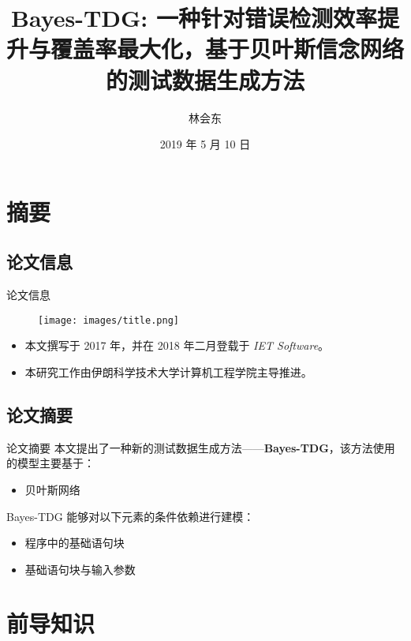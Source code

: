 \documentclass{beamer}
\title{\textbf{Bayes-TDG: 一种针对错误检测效率提升与覆盖率最大化，基于贝叶斯信念网络的测试数据生成方法}}
\author{林会东}
\institute{\textit{华南理工大学~软件学院}}
\date{2019 年 5 月 10 日}
\begin{document}
    \frame{\titlepage}

    \section{摘要}

    \subsection{论文信息}
    \begin{frame}{论文信息}
        \begin{figure}
            \centering
            \texttt{[image: images/title.png]}
        \end{figure}
        \begin{itemize}
            \item 本文撰写于 2017 年，并在 2018 年二月登载于 \textit{IET Software}。
            \item 本研究工作由伊朗科学技术大学计算机工程学院主导推进。
        \end{itemize}
    \end{frame}

    \subsection{论文摘要}
    \begin{frame}{论文摘要}
        本文提出了一种新的测试数据生成方法——\textbf{Bayes-TDG}，该方法使用的模型主要基于：
        \begin{block}{}
            \begin{itemize}
                \item 贝叶斯网络
            \end{itemize}
        \end{block}

        Bayes-TDG 能够对以下元素的条件依赖进行建模：
        \begin{block}{}
            \begin{itemize}
                \item 程序中的基础语句块
                \item 基础语句块与输入参数
            \end{itemize}
        \end{block}
    \end{frame}

    \section{前导知识}
\end{document}
